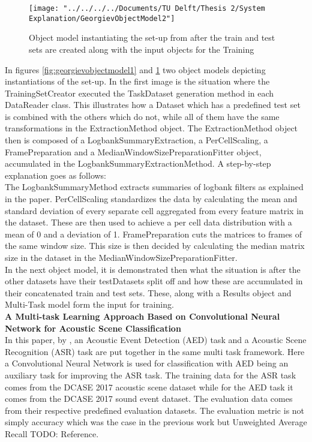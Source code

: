 \begin{figure}
	\centering
	\texttt{[image: "../../../../Documents/TU Delft/Thesis 2/System Explanation/GeorgievObjectModel2"]}
	\caption{Object model instantiating the set-up from \cite{georgiev2017low} after the train and test sets are created along with the input objects for the Training}
	\label{fig:georgievobjectmodel2}
\end{figure}


In figures \ref{fig:georgievobjectmodel1} and \ref{fig:georgievobjectmodel2} two object models depicting instantiations of the set-up. In the first image is the situation where the TrainingSetCreator executed the TaskDataset generation method in each DataReader class. This illustrates how a Dataset which has a predefined test set is combined with the others which do not, while all of them have the same transformations in the ExtractionMethod object. The ExtractionMethod object then is composed of a LogbankSummaryExtraction, a PerCellScaling, a FramePreparation and a MedianWindowSizePreparationFitter object, accumulated in the LogbankSummaryExtractionMethod. A step-by-step explanation goes as follows:\\

The LogbankSummaryMethod extracts summaries of logbank filters as explained in the paper. PerCellScaling standardizes the data by calculating the mean and standard deviation of every separate cell aggregated from every feature matrix in the dataset. These are then used to achieve a per cell data distribution with a mean of 0 and a deviation of 1. FramePreparation cuts the matrices to frames of the same window size. This size is then decided by calculating the median matrix size in the dataset in the MedianWindowSizePreparationFitter. \\
 
In the next object model, it is demonstrated then what the situation is after the other datasets have their testDatasets split off and how these are accumulated in their concatenated train and test sets. These, along with a Results object and Multi-Task model form the input for training.\\


{\large \textbf{A Multi-task Learning Approach Based on Convolutional Neural Network for Acoustic Scene Classification}} \\

In this paper, by \citet{xu2019multi}, an Acoustic Event Detection (AED) task and a Acoustic Scene Recognition (ASR) task are put together in the same multi task framework. Here a Convolutional Neural Network is used for classification with AED being an auxiliary task for improving the ASR task. The training data for the ASR task comes from the DCASE 2017 acoustic scene dataset while for the AED task it comes from the DCASE 2017 sound event dataset. The evaluation data comes from their respective predefined evaluation datasets. The evaluation metric is not simply accuracy which was the case in the previous work but Unweighted Average Recall TODO: Reference.\\

